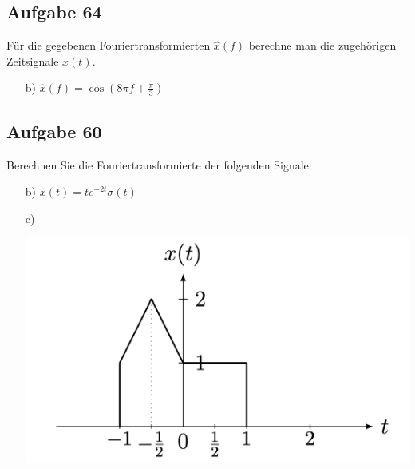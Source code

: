 \documentclass[11pt]{article}
\begin{document}

\subsection*{Aufgabe 64}
Für die gegebenen Fouriertransformierten $\hat{x}(f)$ berechne man die zugehörigen Zeitsignale $x(t)$.
\vspace*{-0.5cm}
\begin{itemize}
    \item[b)] $\hat{x}(f) = \cos(8 \pi f + \frac{\pi}{3})$
\end{itemize}


\pagebreak

\subsection*{Aufgabe 60}
\vspace*{-0.5cm}
Berechnen Sie die Fouriertransformierte der folgenden Signale:
\vspace*{-0.5cm}
\begin{itemize}
    \item[b)] $x(t)= te^{-2t} \sigma(t)$
    \item[c)] 
    \item[] \vspace*{-0.5cm}\includegraphics[width=0.4\linewidth]{docimgs/Aufgabe60.png}
\end{itemize}

\end{document}
